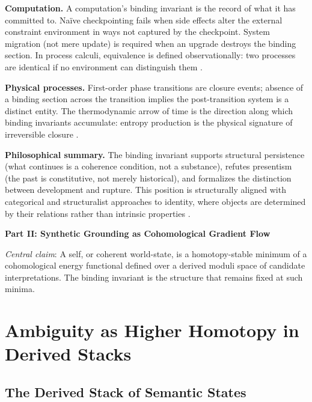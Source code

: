 \documentclass[11pt, letterpaper]{article}
\theoremstyle{plain}
\theoremstyle{definition}
\theoremstyle{remark}
\begin{document}
\textbf{Computation.} A computation's binding invariant is the record of what it has
committed to. Na\"ive checkpointing fails when side effects alter the external
constraint environment in ways not captured by the checkpoint. System migration (not
mere update) is required when an upgrade destroys the binding section. In process
calculi, equivalence is defined observationally: two processes are identical if no
environment can distinguish them \cite{milner,haemmerle2011}.

\textbf{Physical processes.} First-order phase transitions are closure events; absence
of a binding section across the transition implies the post-transition system is a
distinct entity. The thermodynamic arrow of time is the direction along which binding
invariants accumulate: entropy production is the physical signature of irreversible
closure \cite{landauer,bennett,lloyd,jacobson}.

\textbf{Philosophical summary.} The binding invariant supports structural persistence
(what continues is a coherence condition, not a substance), refutes presentism (the
past is constitutive, not merely historical), and formalizes the distinction between
development and rupture. This position is structurally aligned with categorical and
structuralist approaches to identity, where objects are determined by their relations
rather than intrinsic properties \cite{spivak,riehl}.


\vspace{1.2em}
\begin{center}{\large\bfseries Part II: Synthetic Grounding as Cohomological Gradient Flow}\end{center}
\vspace{0.5em}

\noindent\textit{Central claim}: A self, or coherent world-state, is a homotopy-stable
minimum of a cohomological energy functional defined over a derived moduli space of
candidate interpretations. The binding invariant is the structure that remains fixed at
such minima.

\section{Ambiguity as Higher Homotopy in Derived Stacks}

\subsection{The Derived Stack of Semantic States}
\end{document}

